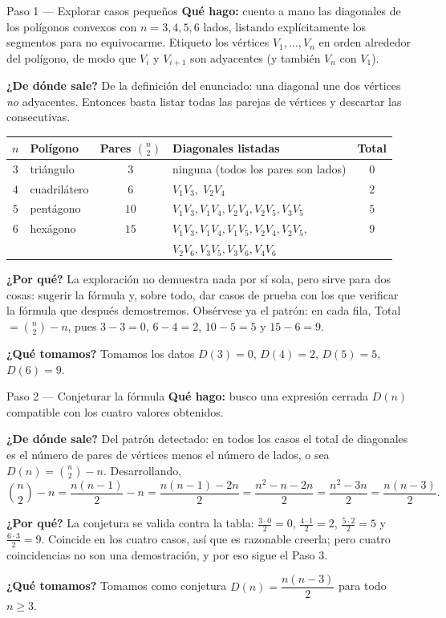 \documentclass[11pt]{article}
\begin{document}
\begin{paso}{Paso 1 --- Explorar casos pequeños}
\textbf{Qué hago:} cuento a mano las diagonales de los polígonos convexos con $n=3,4,5,6$ lados,
listando explícitamente los segmentos para no equivocarme. Etiqueto los vértices $V_1,\dots ,V_n$ en
orden alrededor del polígono, de modo que $V_i$ y $V_{i+1}$ son adyacentes (y también $V_n$ con
$V_1$).

\textbf{¿De dónde sale?} De la definición del enunciado: una diagonal une dos vértices \emph{no}
adyacentes. Entonces basta listar todas las parejas de vértices y descartar las consecutivas.

\medskip
\begin{center}
\renewcommand{\arraystretch}{1.35}
\begin{tabular}{|c|l|c|l|c|}
\hline
$n$ & Polígono & Pares $\binom{n}{2}$ & Diagonales listadas & Total \\ \hline
$3$ & triángulo & $3$ & ninguna (todos los pares son lados) & $0$ \\ \hline
$4$ & cuadrilátero & $6$ & $V_1V_3,\;V_2V_4$ & $2$ \\ \hline
$5$ & pentágono & $10$ & $V_1V_3,V_1V_4,V_2V_4,V_2V_5,V_3V_5$ & $5$ \\ \hline
$6$ & hexágono & $15$ & $V_1V_3,V_1V_4,V_1V_5,V_2V_4,V_2V_5,$ & $9$ \\
    &            &      & $V_2V_6,V_3V_5,V_3V_6,V_4V_6$ & \\ \hline
\end{tabular}
\end{center}
\medskip

\textbf{¿Por qué?} La exploración no demuestra nada por sí sola, pero sirve para dos cosas: sugerir la
fórmula y, sobre todo, dar casos de prueba con los que verificar la fórmula que después demostremos.
Obsérvese ya el patrón: en cada fila, Total $=\binom{n}{2}-n$, pues $3-3=0$, $6-4=2$, $10-5=5$ y
$15-6=9$.

\textbf{¿Qué tomamos?} Tomamos los datos $D(3)=0$, $D(4)=2$, $D(5)=5$, $D(6)=9$.
\end{paso}

\begin{paso}{Paso 2 --- Conjeturar la fórmula}
\textbf{Qué hago:} busco una expresión cerrada $D(n)$ compatible con los cuatro valores obtenidos.

\textbf{¿De dónde sale?} Del patrón detectado: en todos los casos el total de diagonales es el número
de pares de vértices menos el número de lados, o sea $D(n)=\binom{n}{2}-n$. Desarrollando,
\[
\binom{n}{2}-n=\frac{n(n-1)}{2}-n=\frac{n(n-1)-2n}{2}=\frac{n^2-n-2n}{2}=\frac{n^2-3n}{2}=\frac{n(n-3)}{2}.
\]

\textbf{¿Por qué?} La conjetura se valida contra la tabla: $\frac{3\cdot 0}{2}=0$,
$\frac{4\cdot 1}{2}=2$, $\frac{5\cdot 2}{2}=5$ y $\frac{6\cdot 3}{2}=9$. Coincide en los cuatro casos,
así que es razonable creerla; pero cuatro coincidencias no son una demostración, y por eso sigue el
Paso 3.

\textbf{¿Qué tomamos?} Tomamos como conjetura $D(n)=\dfrac{n(n-3)}{2}$ para todo $n\ge 3$.
\end{paso}
\end{document}

